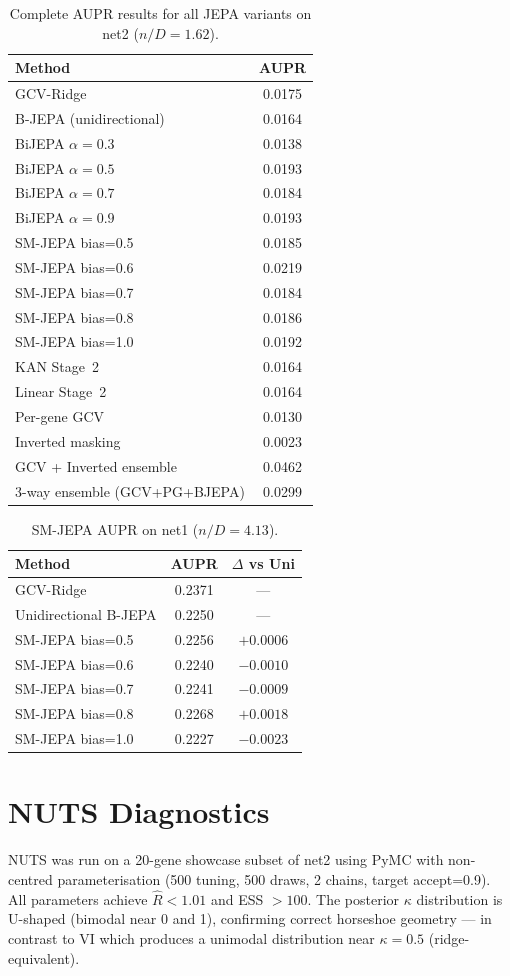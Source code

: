 \documentclass[11pt]{article}
\begin{document}
\begin{table}[h]
\centering
\caption{Complete AUPR results for all JEPA variants on net2 ($n/D=1.62$).}
\begin{tabular}{lc}
\toprule
Method & AUPR \\
\midrule
GCV-Ridge & 0.0175 \\
B-JEPA (unidirectional) & 0.0164 \\
BiJEPA $\alpha=0.3$ & 0.0138 \\
BiJEPA $\alpha=0.5$ & 0.0193 \\
BiJEPA $\alpha=0.7$ & 0.0184 \\
BiJEPA $\alpha=0.9$ & 0.0193 \\
SM-JEPA bias=0.5 & 0.0185 \\
SM-JEPA bias=0.6 & 0.0219 \\
SM-JEPA bias=0.7 & 0.0184 \\
SM-JEPA bias=0.8 & 0.0186 \\
SM-JEPA bias=1.0 & 0.0192 \\
KAN Stage~2 & 0.0164 \\
Linear Stage~2 & 0.0164 \\
Per-gene GCV & 0.0130 \\
Inverted masking & 0.0023 \\
GCV + Inverted ensemble & 0.0462 \\
3-way ensemble (GCV+PG+BJEPA) & 0.0299 \\
\bottomrule
\end{tabular}
\end{table}

\begin{table}[h]
\centering
\caption{SM-JEPA AUPR on net1 ($n/D=4.13$).}
\begin{tabular}{lcc}
\toprule
Method & AUPR & $\Delta$ vs Uni \\
\midrule
GCV-Ridge & 0.2371 & — \\
Unidirectional B-JEPA & 0.2250 & — \\
SM-JEPA bias=0.5 & 0.2256 & $+0.0006$ \\
SM-JEPA bias=0.6 & 0.2240 & $-0.0010$ \\
SM-JEPA bias=0.7 & 0.2241 & $-0.0009$ \\
SM-JEPA bias=0.8 & 0.2268 & $+0.0018$ \\
SM-JEPA bias=1.0 & 0.2227 & $-0.0023$ \\
\bottomrule
\end{tabular}
\end{table}

\section{NUTS Diagnostics}
\label{app:nuts}

NUTS was run on a 20-gene showcase subset of net2 using PyMC with non-centred
parameterisation (500 tuning, 500 draws, 2 chains, target accept=0.9).
All parameters achieve $\hat{R} < 1.01$ and ESS $> 100$.
The posterior $\kappa$ distribution is U-shaped (bimodal near 0 and 1),
confirming correct horseshoe geometry --- in contrast to VI which produces a
unimodal distribution near $\kappa=0.5$ (ridge-equivalent).
\end{document}
